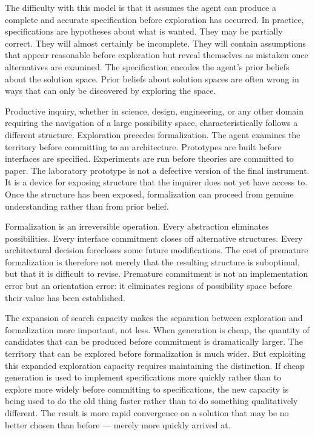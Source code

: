 The difficulty with this model is that it assumes the agent can produce a
complete and accurate specification before exploration has occurred. In practice,
specifications are hypotheses about what is wanted. They may be partially correct.
They will almost certainly be incomplete. They will contain assumptions that
appear reasonable before exploration but reveal themselves as mistaken once
alternatives are examined. The specification encodes the agent's prior beliefs
about the solution space. Prior beliefs about solution spaces are often wrong
in ways that can only be discovered by exploring the space.

Productive inquiry, whether in science, design, engineering, or any other domain
requiring the navigation of a large possibility space, characteristically follows
a different structure. Exploration precedes formalization. The agent examines
the territory before committing to an architecture. Prototypes are built before
interfaces are specified. Experiments are run before theories are committed to
paper. The laboratory prototype is not a defective version of the final instrument.
It is a device for exposing structure that the inquirer does not yet have access
to. Once the structure has been exposed, formalization can proceed from genuine
understanding rather than from prior belief.

\begin{observation}
Formalization is an irreversible operation. Every abstraction eliminates
possibilities. Every interface commitment closes off alternative structures.
Every architectural decision forecloses some future modifications. The cost
of premature formalization is therefore not merely that the resulting structure
is suboptimal, but that it is difficult to revise. Premature commitment is
not an implementation error but an orientation error: it eliminates regions
of possibility space before their value has been established.
\end{observation}

The expansion of search capacity makes the separation between exploration and
formalization more important, not less. When generation is cheap, the quantity
of candidates that can be produced before commitment is dramatically larger.
The territory that can be explored before formalization is much wider. But
exploiting this expanded exploration capacity requires maintaining the distinction.
If cheap generation is used to implement specifications more quickly rather
than to explore more widely before committing to specifications, the new
capacity is being used to do the old thing faster rather than to do something
qualitatively different. The result is more rapid convergence on a solution
that may be no better chosen than before --- merely more quickly arrived at.

